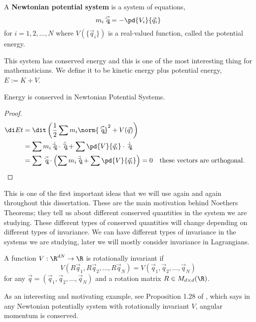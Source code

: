 \begin{ndefi}
  A \textbf{Newtonian potential system} is a system of equations,
  $$ m_i\vec{\ddot q_i} = -\pd{V_i}{\vec q_i} $$
  for $i = 1, 2, \dots, N$ where $V(\{\vec q_i\})$ is a real-valued function, called the potential energy.
\end{ndefi}
\noindent
This system has conserved energy and this is one of the most interesting thing for mathematicians. We define it to be kinetic energy plus potential energy, $E := K + V$.
\begin{nthm}
  Energy is conserved in Newtonian Potential Systems.
\end{nthm}
\begin{proof}
  \begin{align*}
    \di E t &= \dit \left( \frac{1}{2}\sum m_i\norm{\vec{\ddot q_i}}^2 + V(\vec q) \right)\\
    &= \sum m_i \dot {\vec q_i} \cdot \ddot{\vec q_i} + \sum \pd{V}{\vec q_i} \cdot \dot{\vec q_i}\\
    &= \sum \vec{\dot q_i} \cdot \left(\sum m_i \ddot{\vec q_i} + \sum \pd{V}{\vec q_i} \right) = 0 && \text{these vectors are orthogonal.}\\
  \end{align*}
\end{proof}

\noindent
This is one of the first important ideas that we will use again and again throughout this dissertation. These are the main motivation behind Noethers Theorems; they tell us about different conserved quantities in the system we are studying. These different types of conserved quantities will change depending on different types of invariance. We can have different types of invariance in the systems we are studying, later we will mostly consider invariance in Lagrangians.
\begin{ndefi}
  A function $V : \R^{dN} \to \R$ is rotationally invariant if
  $$ V(R\vec q_1, R\vec q_2, \dots, R\vec q_N) = V(\vec q_1, \vec q_2, \dots, \vec q_N) $$
  for any $\vec q = (\vec q_1, \vec q_2, \dots, \vec q_N)$ and a rotation matrix $R \in M_{d \times d}(\R)$.
\end{ndefi}

\noindent
As an interesting and motivating example, see Proposition 1.28 of %
, which says in any Newtonian potentially system with rotationally invariant $V$, angular momentum is conserved.


